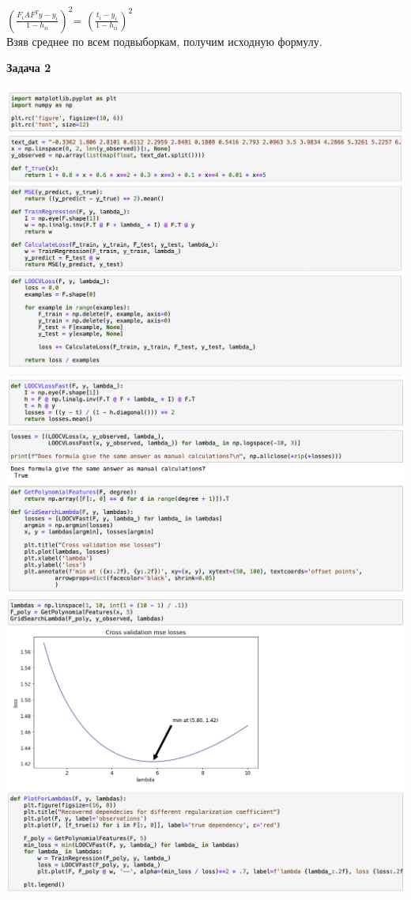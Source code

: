 \documentclass[10pt]{article}
\begin{document}
$\left( \frac{F_i AF^Ty -y_i }{1-h_{ii}} \right)^2$= $\left( \frac{t_i -y_i }{1-h_{ii}} \right)^2$\\

Взяв среднее по всем подвыборкам, получим исходную формулу.

\bigskip

\textbf{Задача 2}

\medskip

\includegraphics[width=.8\textwidth]{Screenshot 2022-04-05 at 16.44.08}\\
\includegraphics[width=.8\textwidth]{Screenshot 2022-04-05 at 16.50.35}\\
\includegraphics[width=.8\textwidth]{Screenshot 2022-04-05 at 16.50.54}\\
\end{document}
